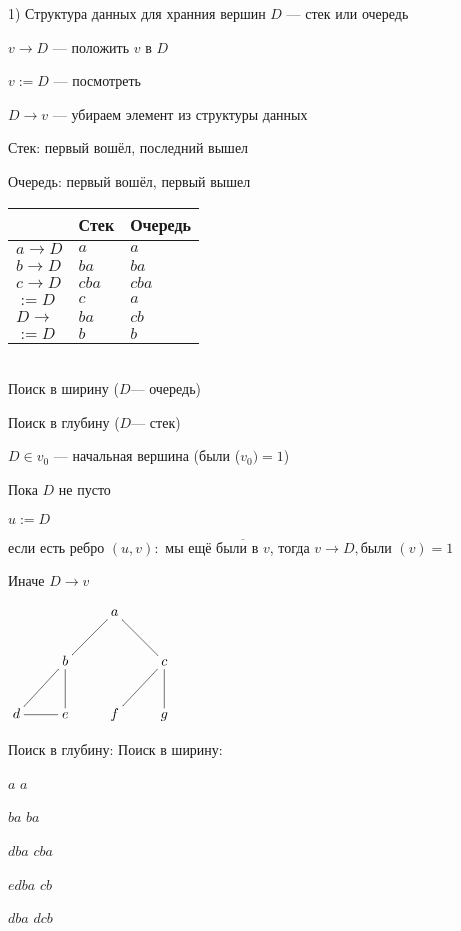 \documentclass[a4paper, 12pt] {article}
\begin{document}
1) Структура данных для хранния вершин $ D $ --- стек или очередь

$ v \rightarrow D $ --- положить $ v $ в $ D $

$ v := D $ --- посмотреть

$ D \rightarrow v $ --- убираем элемент из структуры данных

Стек: первый вошёл, последний вышел

Очередь: первый вошёл, первый вышел

\begin{tabular}{ | l | l | l |}
	\hline
	& Стек & Очередь  \\ \hline
	$ a \rightarrow D $ & $ a $ & $ a $  \\ \hline
	$ b \rightarrow D $ & $ ba $ & $ ba $  \\ \hline
	$ c \rightarrow D $ & $ cba $ &  $ cba $  \\ \hline
	$ := D $ & $ c $ &  $ a $  \\ \hline
	$ D \rightarrow $ & $ ba $ &  $ cb $  \\ \hline
	$:= D $ & $ b $ &  $ b $  \\ \hline
\end{tabular}\\

Поиск в ширину ($ D $--- очередь)

Поиск в глубину ($ D $--- стек)

$ D \in v_{0} $ --- начальная вершина (были ($ v_{0} )=1$)

Пока $ D $ не пусто

$ u := D $

если есть ребро $ (u, v): $ мы ещё $ \overline{\text{были в } v } $, тогда $ v \rightarrow D, \text{были }(v)=1 $

Иначе $ D \rightarrow v $

$\xymatrix{
	 &  & a \ar@{-}[rd] \ar@{-}[ld] &  \\
	  & b \ar@{-}[d] \ar@{-}[ld] &  & c \ar@{-}[d] \ar@{-}[ld] \\
	d \ar@{-}[r] & e & f & g \\
}$
\newpage

Поиск в глубину: \hfill Поиск в ширину:

$ a $ \hfill $ a $

$ ba $ \hfill $ ba $

$ dba $ \hfill $ cba $

$ edba $ \hfill $ cb $

$ dba $ \hfill $ dcb $
\end{document}
